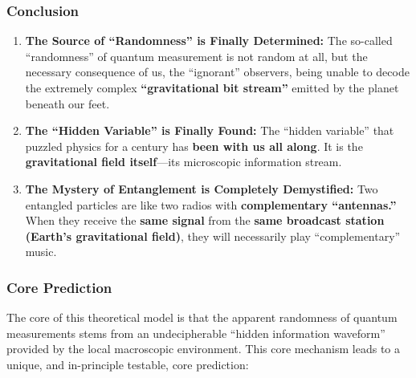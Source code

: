 \documentclass[11pt, a4paper]{article}
\begin{document}
\subsubsection{Conclusion}

\begin{enumerate}
    \item \textbf{The Source of ``Randomness'' is Finally Determined:} The so-called ``randomness'' of quantum measurement is not random at all, but the necessary consequence of us, the ``ignorant'' observers, being unable to decode the extremely complex \textbf{``gravitational bit stream''} emitted by the planet beneath our feet.
    \item \textbf{The ``Hidden Variable'' is Finally Found:} The ``hidden variable'' that puzzled physics for a century has \textbf{been with us all along}. It is the \textbf{gravitational field itself}—its microscopic information stream.
    \item \textbf{The Mystery of Entanglement is Completely Demystified:} Two entangled particles are like two radios with \textbf{complementary ``antennas.''} When they receive the \textbf{same signal} from the \textbf{same broadcast station (Earth's gravitational field)}, they will necessarily play ``complementary'' music.
\end{enumerate}

\subsubsection{Core Prediction}

The core of this theoretical model is that the apparent randomness of quantum measurements stems from an undecipherable ``hidden information waveform'' provided by the local macroscopic environment. This core mechanism leads to a unique, and in-principle testable, core prediction:
\end{document}
